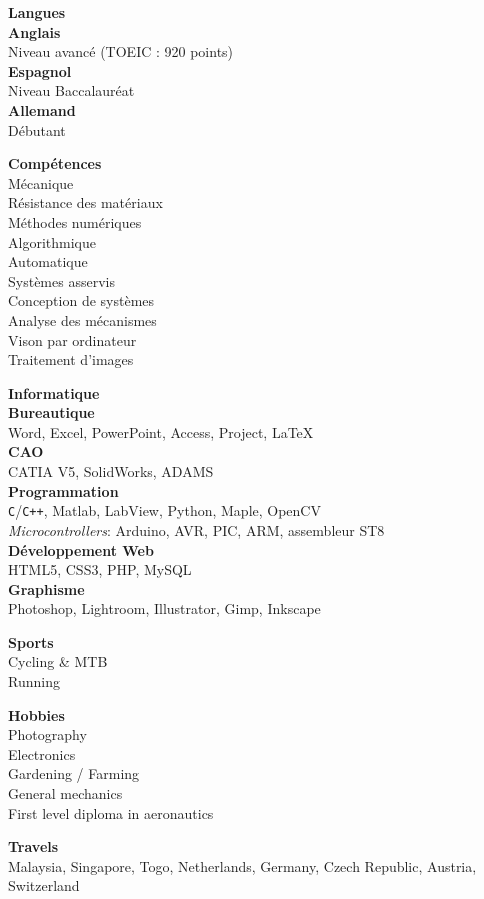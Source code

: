 \documentclass[a4paper,11pt,final]{memoir}
\newcommand{\Sep}{\vspace{1.5em}}
\newcommand{\SmallSep}{\vspace{0.5em}}
\newcommand{\SkillSection}[1]
	{\small{\textbf{#1\\}}\normalfont\footnotesize}
\newcommand{\SkillItem}[1]
	{\textbf{\color{RoyalBlue} #1}\normalfont\\}
\begin{document}
\begin{flushleft}
\SkillSection{Langues}
\SkillItem{Anglais}
Niveau avancé (TOEIC : 920 points)\\
\SkillItem{Espagnol}
Niveau Baccalauréat\\
\SkillItem{Allemand}
Débutant
\Sep

\SkillSection{Compétences}
Mécanique\\
Résistance des matériaux\\
Méthodes numériques\\
Algorithmique\\
Automatique\\
Systèmes asservis\\
Conception de systèmes\\
Analyse des mécanismes\\
Vison par ordinateur\\
Traitement d'images
\Sep

\SkillSection{Informatique}
\SkillItem{Bureautique}
Word, Excel, PowerPoint, Access, Project, \LaTeX\\
\SkillItem{CAO}
CATIA V5, SolidWorks, ADAMS\\
\SkillItem{Programmation}
\verb!C!/\verb!C++!, Matlab, LabView, Python, Maple, OpenCV\\
\emph{Microcontrollers}: Arduino, AVR, PIC, ARM, assembleur ST8\\
\SkillItem{Développement Web}
HTML5, CSS3, PHP, MySQL\\
\SkillItem{Graphisme}
Photoshop, Lightroom, Illustrator, Gimp, Inkscape\\
\Sep

\SkillSection{Sports}
Cycling \& MTB\\
Running\\
\SmallSep

\SkillSection{Hobbies}
Photography\\
Electronics\\
Gardening / Farming\\
General mechanics\\
First level diploma in aeronautics
\SmallSep

\SkillSection{Travels}
Malaysia, Singapore, Togo, Netherlands, Germany, Czech Republic, Austria, Switzerland
\end{flushleft}
\framebreak
\end{document}

